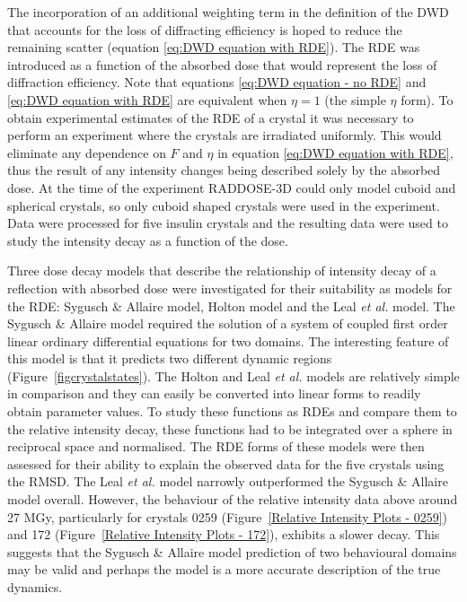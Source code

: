 The incorporation of an additional weighting term in the definition of the DWD that accounts for the loss of diffracting efficiency is hoped to reduce the remaining scatter (equation \ref{eq:DWD equation with RDE}).
The RDE was introduced as a function of the absorbed dose that would represent the loss of diffraction efficiency.
Note that equations \ref{eq:DWD equation - no RDE} and \ref{eq:DWD equation with RDE} are equivalent when $\eta = 1$ (the simple $\eta$ form).
To obtain experimental estimates of the RDE of a crystal it was necessary to perform an experiment where the crystals are irradiated uniformly.
This would eliminate any dependence on $F$ and $\eta$ in equation \ref{eq:DWD equation with RDE}, thus the result of any intensity changes being described solely by the absorbed dose.
At the time of the experiment RADDOSE-3D could only model cuboid and spherical crystals, so only cuboid shaped crystals were used in the experiment.
Data were processed for five insulin crystals and the resulting data were used to study the intensity decay as a function of the dose.

Three dose decay models that describe the relationship of intensity decay of a reflection with absorbed dose were investigated for their suitability as models for the RDE: Sygusch \& Allaire model, Holton model and the Leal \textit{et al.} model.
The Sygusch \& Allaire model required the solution of a system of coupled first order linear ordinary differential equations for two domains.
The interesting feature of this model is that it predicts two different dynamic regions (Figure~\ref{figcrystalstates}).
The Holton and Leal \textit{et al.} models are relatively simple in comparison and they can easily be converted into linear forms to readily obtain parameter values.
To study these functions as RDEs and compare them to the relative intensity decay, these functions had to be integrated over a sphere in reciprocal space and normalised.
The RDE forms of these models were then assessed for their ability to explain the observed data for the five crystals using the RMSD.
The Leal \textit{et al.} model narrowly outperformed the Sygusch \& Allaire model overall.
However, the behaviour of the relative intensity data above around 27 MGy, particularly for crystals 0259 (Figure~\ref{Relative Intensity Plots - 0259}) and 172 (Figure~\ref{Relative Intensity Plots - 172}), exhibits a slower decay.
This suggests that the Sygusch \& Allaire model prediction of two behavioural domains may be valid and perhaps the model is a more accurate description of the true dynamics.

